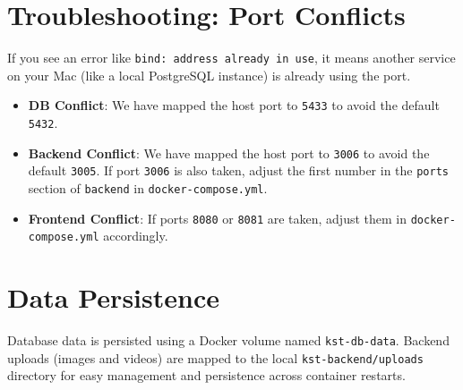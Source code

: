 \documentclass{article}
\begin{document}
\section{Troubleshooting: Port Conflicts}
If you see an error like \texttt{bind: address already in use}, it means another service on your Mac (like a local PostgreSQL instance) is already using the port.
\begin{itemize}
    \item \textbf{DB Conflict}: We have mapped the host port to \texttt{5433} to avoid the default \texttt{5432}.
    \item \textbf{Backend Conflict}: We have mapped the host port to \texttt{3006} to avoid the default \texttt{3005}. If port \texttt{3006} is also taken, adjust the first number in the \texttt{ports} section of \texttt{backend} in \texttt{docker-compose.yml}.
    \item \textbf{Frontend Conflict}: If ports \texttt{8080} or \texttt{8081} are taken, adjust them in \texttt{docker-compose.yml} accordingly.
\end{itemize}

\section{Data Persistence}
Database data is persisted using a Docker volume named \texttt{kst-db-data}. Backend uploads (images and videos) are mapped to the local \texttt{kst-backend/uploads} directory for easy management and persistence across container restarts.
\end{document}
